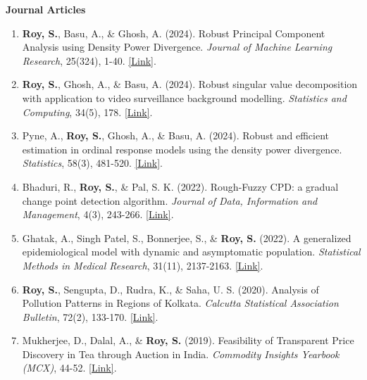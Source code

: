 \documentclass[10pt]{developercv} %
\begin{document}
\textbf{Journal Articles}
\begin{enumerate}
    \item \textbf{Roy, S.}, Basu, A., \& Ghosh, A. (2024). Robust Principal Component Analysis using Density Power Divergence. \emph{Journal of Machine Learning Research}, 25(324), 1-40. \href{https://www.jmlr.org/papers/v25/23-1096.html}{[Link]}.
    \item \textbf{Roy, S.}, Ghosh, A., \& Basu, A. (2024). Robust singular value decomposition with application to video surveillance background modelling. \emph{Statistics and Computing}, 34(5), 178. \href{https://link.springer.com/article/10.1007/s11222-024-10493-7}{[Link]}.
    \item Pyne, A., \textbf{Roy, S.}, Ghosh, A., \& Basu, A. (2024). Robust and efficient estimation in ordinal response models using the density power divergence. \emph{Statistics}, 58(3), 481-520. \href{https://www.tandfonline.com/doi/abs/10.1080/02331888.2024.2347329}{[Link]}.        
    \item Bhaduri, R., \textbf{Roy, S.}, \& Pal, S. K. (2022). Rough-Fuzzy CPD: a gradual change point detection algorithm. \emph{Journal of Data, Information and Management}, 4(3), 243-266. \href{https://link.springer.com/article/10.1007/s42488-022-00077-3}{[Link]}.
    \item Ghatak, A., Singh Patel, S., Bonnerjee, S., \& \textbf{Roy, S.} (2022). A generalized epidemiological model with dynamic and asymptomatic population. \emph{Statistical Methods in Medical Research}, 31(11), 2137-2163. \href{https://journals.sagepub.com/doi/abs/10.1177/09622802221115877}{[Link]}.
    \item \textbf{Roy, S.}, Sengupta, D., Rudra, K., \& Saha, U. S. (2020). Analysis of Pollution Patterns in Regions of Kolkata. \emph{Calcutta Statistical Association Bulletin}, 72(2), 133-170. \href{https://journals.sagepub.com/doi/abs/10.1177/0008068320976781}{[Link]}.
    \item Mukherjee, D., Dalal, A., \& \textbf{Roy, S.} (2019). Feasibility of Transparent Price Discovery in Tea through Auction in India. \emph{Commodity Insights Yearbook (MCX)}, 44-52. \href{https://www.mcxindia.com/docs/default-source/about-us/commodity-insights-yearbook/2019/02-emerging-trends/feasibility-of-transparent-price-discovery-in-tea-through-auction-in-india-dr-diganta-mukherjee-mr-abhinandan-dalal-and-mr-subhrajyoty-roy.pdf}{[Link]}.
\end{enumerate}
\end{document}
